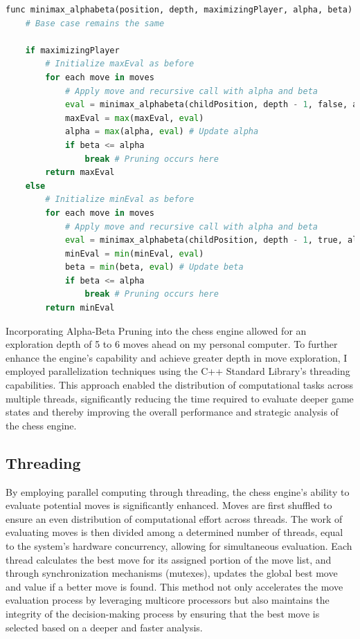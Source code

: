 \documentclass{article}
\begin{document}
\begin{lstlisting}[language=Python, caption=Alpha-Beta Pruning Enhancements]
func minimax_alphabeta(position, depth, maximizingPlayer, alpha, beta)
    # Base case remains the same

    if maximizingPlayer
        # Initialize maxEval as before
        for each move in moves
            # Apply move and recursive call with alpha and beta
            eval = minimax_alphabeta(childPosition, depth - 1, false, alpha, beta)
            maxEval = max(maxEval, eval)
            alpha = max(alpha, eval) # Update alpha
            if beta <= alpha
                break # Pruning occurs here
        return maxEval
    else
        # Initialize minEval as before
        for each move in moves
            # Apply move and recursive call with alpha and beta
            eval = minimax_alphabeta(childPosition, depth - 1, true, alpha, beta)
            minEval = min(minEval, eval)
            beta = min(beta, eval) # Update beta
            if beta <= alpha
                break # Pruning occurs here
        return minEval
\end{lstlisting}


Incorporating Alpha-Beta Pruning into the chess engine allowed for an exploration depth of 5 to 6 moves ahead on my personal computer. To further enhance the engine's capability and achieve greater depth in move exploration, I employed parallelization techniques using the C++ Standard Library's threading capabilities. This approach enabled the distribution of computational tasks across multiple threads, significantly reducing the time required to evaluate deeper game states and thereby improving the overall performance and strategic analysis of the chess engine.


\subsection{Threading}
By employing parallel computing through threading, the chess engine's ability to evaluate potential moves is significantly enhanced. Moves are first shuffled to ensure an even distribution of computational effort across threads. The work of evaluating moves is then divided among a determined number of threads, equal to the system's hardware concurrency, allowing for simultaneous evaluation. Each thread calculates the best move for its assigned portion of the move list, and through synchronization mechanisms (mutexes), updates the global best move and value if a better move is found. This method not only accelerates the move evaluation process by leveraging multicore processors but also maintains the integrity of the decision-making process by ensuring that the best move is selected based on a deeper and faster analysis.
\end{document}
